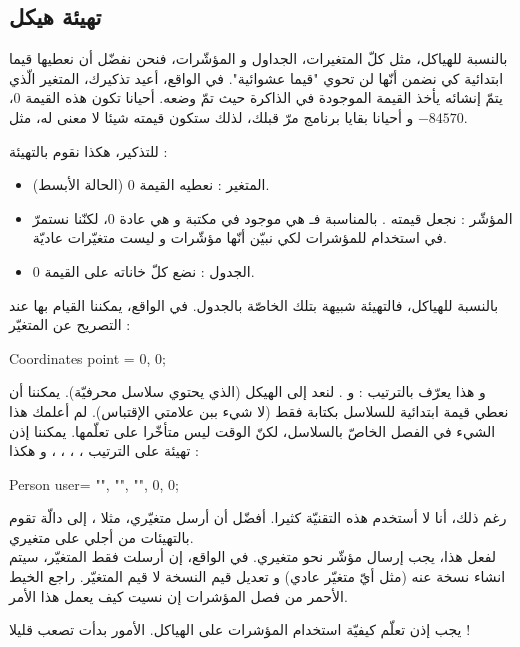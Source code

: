 \subsection{تهيئة هيكل}
بالنسبة للهياكل، مثل كلّ المتغيرات، الجداول و المؤشّرات، فنحن نفضّل أن نعطيها قيما ابتدائية كي نضمن أنّها لن تحوي "قيما عشوائية". في الواقع، أعيد تذكيرك، المتغير الّذي يتمّ إنشائه يأخذ القيمة الموجودة في الذاكرة حيث تمّ وضعه. أحيانا تكون هذه القيمة 0، و أحيانا بقايا برنامج مرّ قبلك، لذلك ستكون قيمته شيئا لا معنى له، مثل
$-84570$.

للتذكير، هكذا نقوم بالتهيئة :
\begin{itemize}
  \item  المتغير : نعطيه القيمة 0 (الحالة الأبسط).
  \item المؤشّر : نجعل قيمته
.
بالمناسبة فـ
هي
موجود في مكتبة
و هي عادة 0، لكنّنا نستمرّ في استخدام
للمؤشرات لكي نبيّن أنّها مؤشّرات و ليست متغيّرات عاديّة.
  \item الجدول : نضع كلّ خاناته على القيمة 0.
\end{itemize}
بالنسبة للهياكل، فالتهيئة شبيهة بتلك الخاصّة بالجدول. في الواقع، يمكننا القيام بها عند التصريح عن المتغيّر :
\begin{Csource}
Coordinates point = {0, 0};
\end{Csource}
و هذا يعرّف بالترتيب :
و
.
لنعد إلى الهيكل
(الذي يحتوي سلاسل محرفيّة). يمكننا أن نعطي قيمة ابتدائية للسلاسل بكتابة فقط
(لا شيء ببن علامتي الإقتباس). لم أعلمك هذا الشيء في الفصل الخاصّ بالسلاسل، لكنّ الوقت ليس متأخّرا على تعلّمها.
يمكننا إذن تهيئة على الترتيب
،
،
،
،
و
هكذا :

\begin{Csource}
Person user= {"", "", "", 0, 0};
\end{Csource}

رغم ذلك، أنا لا أستخدم هذه التقنيّة كثيرا. أفضّل أن أرسل متغيّري، مثلا
،
إلى دالّة
تقوم بالتهيئات من أجلي على متغيري.\\
لفعل هذا، يجب إرسال مؤشّر نحو متغيري. في الواقع، إن أرسلت فقط المتغيّر، سيتم انشاء نسخة عنه (مثل أيّ متغيّر عادي) و تعديل قيم النسخة لا قيم المتغيّر. راجع الخيط الأحمر من فصل المؤشرات إن نسيت كيف يعمل هذا الأمر.

يجب إذن تعلّم كيفيّة استخدام المؤشرات على الهياكل. الأمور بدأت تصعب قليلا !

